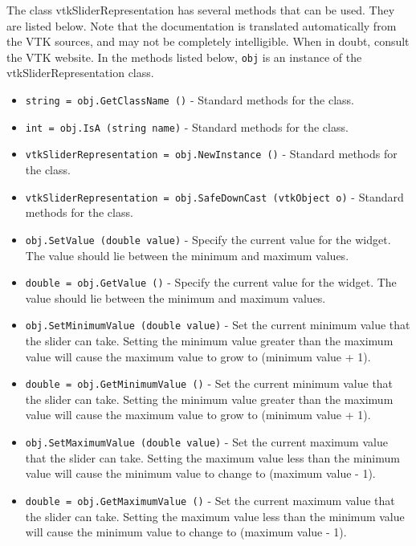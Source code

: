 The class vtkSliderRepresentation has several methods that can be used.
  They are listed below.
Note that the documentation is translated automatically from the VTK sources,
and may not be completely intelligible.  When in doubt, consult the VTK website.
In the methods listed below, \verb|obj| is an instance of the vtkSliderRepresentation class.
\begin{itemize}
\item  \verb|string = obj.GetClassName ()| -  Standard methods for the class.

\item  \verb|int = obj.IsA (string name)| -  Standard methods for the class.

\item  \verb|vtkSliderRepresentation = obj.NewInstance ()| -  Standard methods for the class.

\item  \verb|vtkSliderRepresentation = obj.SafeDownCast (vtkObject o)| -  Standard methods for the class.

\item  \verb|obj.SetValue (double value)| -  Specify the current value for the widget. The value should lie between
 the minimum and maximum values.

\item  \verb|double = obj.GetValue ()| -  Specify the current value for the widget. The value should lie between
 the minimum and maximum values.

\item  \verb|obj.SetMinimumValue (double value)| -  Set the current minimum value that the slider can take. Setting the
 minimum value greater than the maximum value will cause the maximum
 value to grow to (minimum value + 1).

\item  \verb|double = obj.GetMinimumValue ()| -  Set the current minimum value that the slider can take. Setting the
 minimum value greater than the maximum value will cause the maximum
 value to grow to (minimum value + 1).

\item  \verb|obj.SetMaximumValue (double value)| -  Set the current maximum value that the slider can take. Setting the
 maximum value less than the minimum value will cause the minimum
 value to change to (maximum value - 1).

\item  \verb|double = obj.GetMaximumValue ()| -  Set the current maximum value that the slider can take. Setting the
 maximum value less than the minimum value will cause the minimum
 value to change to (maximum value - 1).


\end{itemize}
